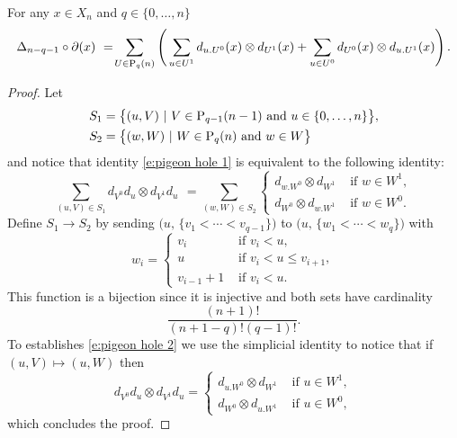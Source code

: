 
\begin{lemma} \label{l:pigeon hole}
	For any $x \in X_n$ and $q \in \{0, \dots, n\}$
	\begin{equation} \label{e:pigeon hole 1}
	\Delta_{n-q-1} \circ \partial (x)\ =\! 
	\sum_{U \in \P_q(n)} \left( \,
	\sum_{u \in U^1} d_{u.U^0}(x) \otimes d_{U^1}(x) + 
	\sum_{u \in U^0} d_{U^0}(x) \otimes d_{u.U^1}(x) \right).
	\end{equation}
\end{lemma}

\begin{proof}
	Let
	\begin{align*}
	& S_1 = \big\{ (u, V)\ |\ V \in \P_{q-1}(n-1) \text{ and } u \in \{0,\dots,n\} \big\}, \\
	& S_2 = \big\{ (w, W)\ |\ W \in \P_{q}(n) \text{ and } w \in W \big\}
	\end{align*}
	and notice that identity \eqref{e:pigeon hole 1} is equivalent to the following identity:
	\begin{equation} \label{e:pigeon hole 2}
	\sum_{(u, V) \in S_1} d_{V^0}d_u \otimes d_{V^1}d_u \ \, = \!
	\sum_{(w, W) \in S_2} 
	\begin{cases}
	d_{w.W^0} \otimes d_{W^1} & \text{ if } w \in W^1, \\
	d_{W^0} \otimes d_{w.W^1} & \text{ if } w \in W^0.
	\end{cases}
	\end{equation}	
	Define $S_1 \to S_2$ by sending $\big(u,\, \{v_1 < \cdots < v_{q-1}\} \big)$ to $\big(u,\, \{w_1 < \cdots < w_{q}\} \big)$ with
	\begin{equation*}
	w_i = 
	\begin{cases}
	v_i & \text{ if } v_i < u, \\
	u & \text{ if } v_i < u \leq v_{i+1}, \\
	v_{i-1}+1 & \text{ if } v_i < u.
	\end{cases}
	\end{equation*} 
	This function is a bijection since it is injective and both sets have cardinality 
	\begin{equation*}
	\frac{(n+1)!}{(n+1-q)!(q-1)!}.
	\end{equation*}
	To establishes \eqref{e:pigeon hole 2} we use the simplicial identity to notice that if $(u, V) \mapsto (u, W)$ then
	\begin{equation*}
	d_{V^0}d_u \otimes d_{V^1}d_u =
	\begin{cases}
	d_{u.W^0} \otimes d_{W^1} & \text{ if } u \in W^1, \\
	d_{W^0} \otimes d_{u.W^1} & \text{ if } u \in W^0,
	\end{cases}
	\end{equation*}
	which concludes the proof.
\end{proof}

